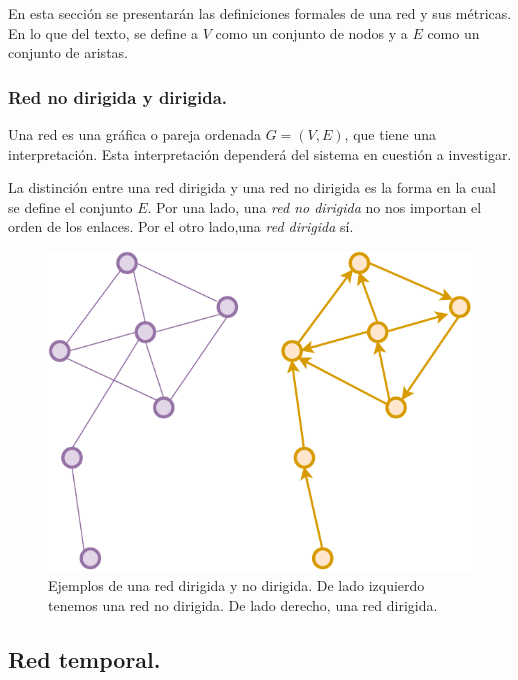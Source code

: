 \documentclass[../main.tex]{subfiles}
\begin{document}
En esta sección se presentarán las definiciones formales de una red y sus métricas. En lo que del texto, se define a $V$ como un conjunto de nodos y a $E$ como un conjunto de aristas.

\subsubsection{Red no dirigida y dirigida.}


Una red  es una gráfica o pareja ordenada $G = (V,E)$, que tiene una interpretación. Esta interpretación dependerá del sistema en cuestión a investigar.

La distinción entre una red dirigida y una red no dirigida es la forma en la cual se define el conjunto $E$. Por una lado, una \textit{red no dirigida} no nos importan el orden de los enlaces. Por el otro lado,una \textit{red dirigida} sí.



\begin{figure}[h!]
    \centering
    \includegraphics[scale = 0.8]{images/marcoteorico_graphdigraph.pdf}
    \caption{Ejemplos de una red dirigida y no dirigida. De lado izquierdo tenemos una red no dirigida. De lado derecho, una red dirigida. }
    \label{fig:marcoteorico_graph_digraph}
\end{figure}

\subsection{Red temporal.}
\end{document}
